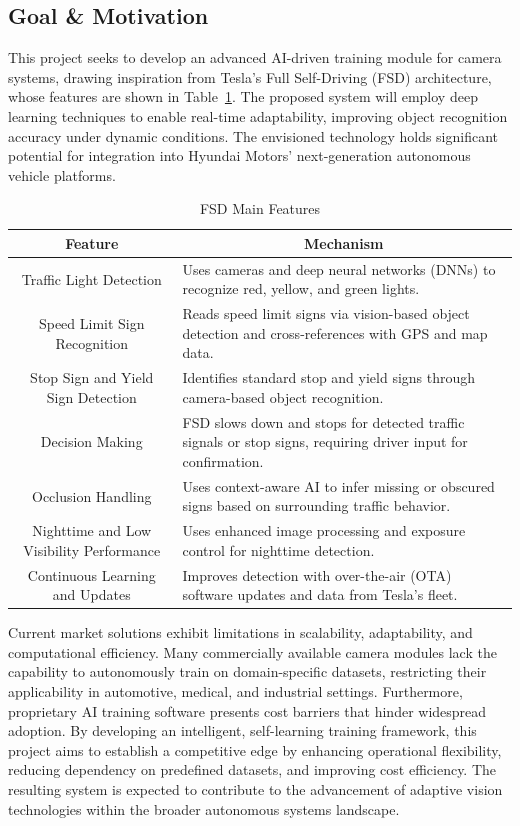 \documentclass[journal,transmag]{IEEEtran}
\begin{document}
\subsection{Goal \& Motivation}

This project seeks to develop an advanced AI-driven training module for camera systems, drawing inspiration from Tesla’s Full Self-Driving (FSD) architecture\cite{FSD}\cite{Autopilot}, whose features are shown in Table~\ref{tab:FSD_Feature}. The proposed system will employ deep learning techniques to enable real-time adaptability, improving object recognition accuracy under dynamic conditions. The envisioned technology holds significant potential for integration into Hyundai Motors' next-generation autonomous vehicle platforms.

\begin{table}[t]
\centering
\caption{FSD Main Features}
\label{tab:FSD_Feature}
\begin{tabular}{|c|p{12cm}|}  
\hline
\textbf{Feature} & \multicolumn{1}{c|}{\textbf{Mechanism}} \\
\hline
Traffic Light Detection & Uses cameras and deep neural networks (DNNs) to recognize red, yellow, and green lights. \\
\hline
Speed Limit Sign Recognition & Reads speed limit signs via vision-based object detection and cross-references with GPS and map data. \\
\hline
Stop Sign and Yield Sign Detection & Identifies standard stop and yield signs through camera-based object recognition. \\
\hline
Decision Making & FSD slows down and stops for detected traffic signals or stop signs, requiring driver input for confirmation. \\
\hline
Occlusion Handling & Uses context-aware AI to infer missing or obscured signs based on surrounding traffic behavior. \\
\hline
Nighttime and Low Visibility Performance & Uses enhanced image processing and exposure control for nighttime detection. \\
\hline
Continuous Learning and Updates & Improves detection with over-the-air (OTA) software updates and data from Tesla’s fleet. \\
\hline
\end{tabular}
\end{table}




Current market solutions exhibit limitations in scalability, adaptability, and computational efficiency. Many commercially available camera modules lack the capability to autonomously train on domain-specific datasets, restricting their applicability in automotive, medical, and industrial settings. Furthermore, proprietary AI training software presents cost barriers that hinder widespread adoption. By developing an intelligent, self-learning training framework, this project aims to establish a competitive edge by enhancing operational flexibility, reducing dependency on predefined datasets, and improving cost efficiency. The resulting system is expected to contribute to the advancement of adaptive vision technologies within the broader autonomous systems landscape.
\end{document}
